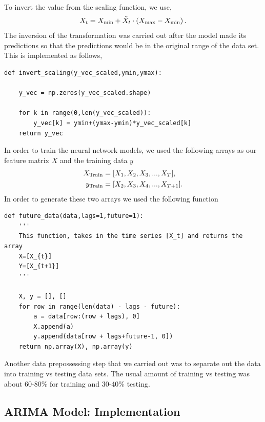 \documentclass[10pt,a4paper]{article}
\begin{document}
To invert the value from the scaling function, we use,
\begin{equation}
X_{t} = X_{\rm min} + \tilde{X}_t\cdot \left(X_{\rm max} - X_{\rm min} \right).
\end{equation}
The inversion of the transformation was carried out after the model made its predictions so that the predictions would be in the original range of the data set. This is implemented as follows,
\begin{lstlisting}
def invert_scaling(y_vec_scaled,ymin,ymax):
    
    y_vec = np.zeros(y_vec_scaled.shape)
        
    for k in range(0,len(y_vec_scaled)):
        y_vec[k] = ymin+(ymax-ymin)*y_vec_scaled[k]
    return y_vec
\end{lstlisting}
In order to train the neural network models, we used the following arrays as our feature matrix $X$ and the training data $y$
\begin{align}
X_{\rm Train} &= [{X_{1},X_2,X_3, ..., X_T}], \\
y_{\rm Train} &= [{X_{2},X_3,X_4, ..., X_{T+1}}].
\end{align}
In order to generate these two arrays we used the following function
\begin{lstlisting}
def future_data(data,lags=1,future=1):
    '''
    This function, takes in the time series [X_t] and returns the array
    X=[X_{t}]
    Y=[X_{t+1}]
    '''
    
    X, y = [], []
    for row in range(len(data) - lags - future):
        a = data[row:(row + lags), 0]
        X.append(a)
        y.append(data[row + lags+future-1, 0])
    return np.array(X), np.array(y)
\end{lstlisting}
Another data prepossessing step that we carried out was to separate out the data into training vs testing data sets. The usual amount of training vs testing was about 60-80$\%$ for training and 30-40$\%$ testing.


\subsection{ARIMA Model: Implementation}\label{section: Fitting ARIMA}
\end{document}

